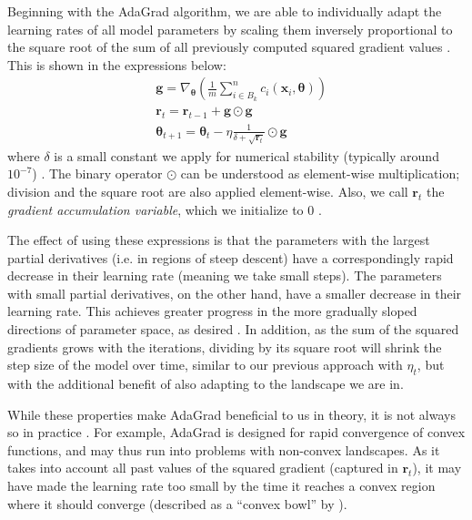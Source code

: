 Beginning with the AdaGrad algorithm, we are able to individually adapt the learning rates of all model parameters by scaling them inversely proportional to the square root of the sum of all previously computed squared gradient values \cite{deeplearningbookChapter8}. This is shown in the expressions below:
\begin{align*}
    &\boldsymbol{g} = \nabla_{\boldsymbol{\theta}} \left ( \frac{1}{m} \sum_{i\in B_k}^n c_i (\boldsymbol{x}_i, \boldsymbol{\theta} ) \right )
    \\
    &\boldsymbol r_t = \boldsymbol r_{t-1} + \boldsymbol{g} \odot \boldsymbol{g}
    \\
    &\boldsymbol{\theta}_{t+1} = \boldsymbol{\theta}_t - \eta \frac{1}{\delta + \sqrt{\boldsymbol r_t}} \odot \boldsymbol{g}
\end{align*}
where $\delta$ is a small constant we apply for numerical stability (typically around $10^{-7}$) \cite{deeplearningbookChapter8}. The binary operator $\odot$ can be understood as element-wise multiplication; division and the square root are also applied element-wise. Also, we call $\boldsymbol r_t$ the \emph{gradient accumulation variable}, which we initialize to 0 \cite{deeplearningbookChapter8}.

The effect of using these expressions is that the parameters with the largest partial derivatives (i.e. in regions of steep descent) have a correspondingly rapid decrease in their learning rate (meaning we take small steps).  The parameters with small partial derivatives, on the other hand, have a smaller decrease in their learning rate. This achieves greater progress in the more gradually sloped directions of parameter space, as desired \cite{deeplearningbookChapter8}. In addition, as the sum of the squared gradients grows with the iterations, dividing by its square root will shrink the step size of the model over time, similar to our previous approach with $\eta_t$, but with the additional benefit of also adapting to the landscape we are in.

While these properties make AdaGrad beneficial to us in theory, it is not always so in practice \cite{deeplearningbookChapter8}. For example, AdaGrad is designed for rapid convergence of convex functions, and may thus run into problems with non-convex landscapes. As it takes into account all past values of the squared gradient (captured in $\boldsymbol r_t$), it may have made the learning rate too small by the time it reaches a convex region where it should converge (described as a ``convex bowl'' by \textcite{deeplearningbookChapter8}). 


